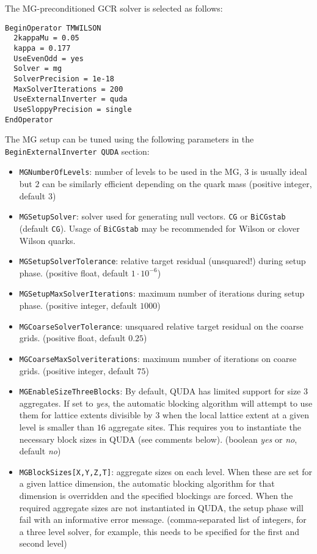 The MG-preconditioned GCR solver is selected as follows:
\begin{verbatim}
BeginOperator TMWILSON
  2kappaMu = 0.05
  kappa = 0.177
  UseEvenOdd = yes
  Solver = mg
  SolverPrecision = 1e-18
  MaxSolverIterations = 200
  UseExternalInverter = quda
  UseSloppyPrecision = single
EndOperator
\end{verbatim}

The MG setup can be tuned using the following parameters in the \texttt{BeginExternalInverter QUDA} section:
\begin{itemize}
  \item{ \texttt{MGNumberOfLevels}: number of levels to be used in the MG, $3$ is usually ideal but $2$ can be similarly efficient depending on the quark mass (positive integer, default $3$) }
  \item{ \texttt{MGSetupSolver}: solver used for generating null vectors. \texttt{CG} or \texttt{BiCGstab} (default \texttt{CG}). Usage of \texttt{BiCGstab} may be recommended for Wilson or clover Wilson quarks. }
  \item{ \texttt{MGSetupSolverTolerance}: relative target residual (unsquared!) during setup phase. (positive float, default $1\cdot10^{-6}$) }
  \item{ \texttt{MGSetupMaxSolverIterations}: maximum number of iterations during setup phase. (positive integer, default $1000$) }
  \item{ \texttt{MGCoarseSolverTolerance}: unsquared relative target residual on the coarse grids. (positive float, default $0.25$) }
  \item{ \texttt{MGCoarseMaxSolveriterations}: maximum number of iterations on coarse grids. (positive integer, default $75$) }
  \item{ \texttt{MGEnableSizeThreeBlocks}: By default, QUDA has limited support for size $3$ aggregates. If set to \emph{yes}, the automatic blocking algorithm will attempt to use them for lattice extents divisible by $3$ when the local lattice extent at a given level is smaller than $16$ aggregate sites. This requires you to instantiate the necessary block sizes in QUDA (see comments below). (boolean \emph{yes} or \emph{no}, default \emph{no}) }
  \item{ \texttt{MGBlockSizes[X,Y,Z,T]}: aggregate sizes on each level. When these are set for a given lattice dimension, the automatic blocking algorithm for that dimension is overridden and the specified blockings are forced. When the required aggregate sizes are not instantiated in QUDA, the setup phase will fail with an informative error message. (comma-separated list of integers, for a three level solver, for example, this needs to be specified for the first and second level)} 

\end{itemize}
